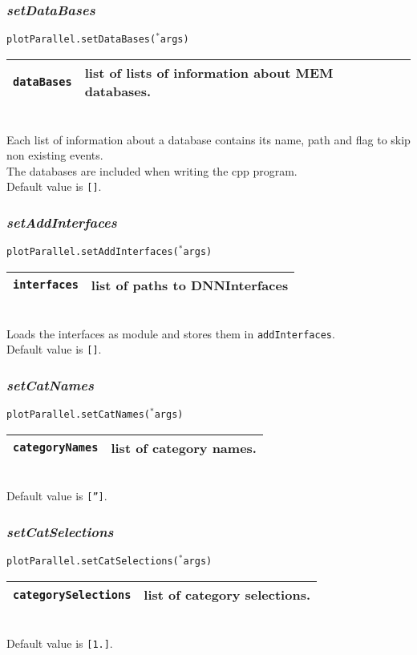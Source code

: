 \documentclass[12pt, a4paper]{article}
\newcommand{\args}{$^*$args}
\begin{document}
\subsubsection{\textit{setDataBases}}
\texttt{plotParallel.setDataBases(\args)}\\
\begin{tabular}{r|l}
\hline
\texttt{dataBases}	& list of lists of information about MEM databases.\\
\hline
\end{tabular}
\\
Each list of information about a database contains its name, path and flag to skip non existing events.\\
The databases are included when writing the cpp program.\\
Default value is \texttt{[]}.


\subsubsection{\textit{setAddInterfaces}}
\texttt{plotParallel.setAddInterfaces(\args)}\\
\begin{tabular}{r|l}
\hline
\texttt{interfaces}	& list of paths to DNNInterfaces \\
\hline
\end{tabular}
\\
Loads the interfaces as module and stores them in \texttt{addInterfaces}.\\
Default value is \texttt{[]}.


\subsubsection{\textit{setCatNames}}
\texttt{plotParallel.setCatNames(\args)}\\
\begin{tabular}{r|l}
\hline
\texttt{categoryNames}	&	list of category names.\\
\hline
\end{tabular}
\\
Default value is \texttt{['']}.


\subsubsection{\textit{setCatSelections}}
\texttt{plotParallel.setCatSelections(\args)}\\
\begin{tabular}{r|l}
\hline
\texttt{categorySelections}	&	list of category selections.\\
\hline
\end{tabular}
\\
Default value is \texttt{[1.]}.
\end{document}

